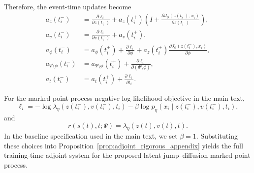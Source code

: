 \documentclass[11pt]{article}
\theoremstyle{definition}
\numberwithin{equation}{section}
\numberwithin{theorem}{section}
\numberwithin{proposition}{section}
\numberwithin{lemma}{section}
\numberwithin{corollary}{section}
\numberwithin{definition}{section}
\numberwithin{remark}{section}
\newcommand{\1}{\mathbbm{1}}
\begin{document}
Therefore, the event-time updates become
\begin{align}
\label{eq:app_specific_jump_z}
a_z(t_i^-)
&=
\frac{\partial \ell_i}{\partial z(t_i^-)}
+
a_z(t_i^+)
\left(
I+\frac{\partial J_\phi(z(t_i^-),x_i)}{\partial z(t_i^-)}
\right),\\
\label{eq:app_specific_jump_v}
a_v(t_i^-)
&=
\frac{\partial \ell_i}{\partial v(t_i^-)}
+
a_v(t_i^+),\\
\label{eq:app_specific_jump_phi}
a_\phi(t_i^-)
&=
a_\phi(t_i^+)
+
\frac{\partial \ell_i}{\partial \phi}
+
a_z(t_i^+)\frac{\partial J_\phi(z(t_i^-),x_i)}{\partial \phi},\\
\label{eq:app_specific_jump_other}
a_{\Psi\setminus\phi}(t_i^-)
&=
a_{\Psi\setminus\phi}(t_i^+)
+
\frac{\partial \ell_i}{\partial (\Psi\setminus\phi)},\\
\label{eq:app_specific_jump_time}
a_t(t_i^-)
&=
a_t(t_i^+)
+
\frac{\partial \ell_i}{\partial t_i}.
\end{align}

For the marked point process negative log-likelihood objective in the main text,
\[
\ell_i
=
-\log \lambda_\eta(z(t_i^-),v(t_i^-),t_i)
-\beta\log p_\eta(x_i\mid z(t_i^-),v(t_i^-),t_i),
\]
and
\[
r(s(t),t;\Psi)=\lambda_\eta(z(t),v(t),t).
\]
In the baseline specification used in the main text, we set $\beta=1$.
Substituting these choices into Proposition~\ref{prop:adjoint_rigorous_appendix} yields the full training-time adjoint system for the proposed latent jump--diffusion marked point process.







\end{document}
